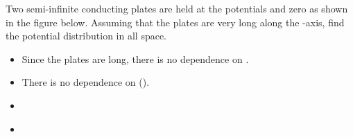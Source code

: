 \begin{ELexample}{}

Two semi-infinite conducting plates are held at the potentials  and zero as shown in the figure below. Assuming that the plates are very long along the -axis, find the potential distribution in all space.


\begin{ELsolution}

\begin{itemize}
\tightlist
\item
  Since the plates are long, there is no dependence on .
\item
  There is no dependence on  ().
\end{itemize}


\begin{itemize}
\tightlist
\item
  \ELim{0\leq\phi\leq\alpha}
\end{itemize}


\begin{itemize}
\tightlist
\item
\end{itemize}


\end{ELsolution}

\end{ELexample}


